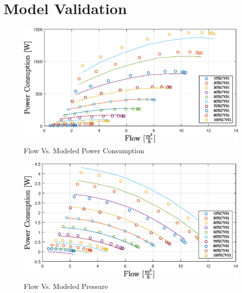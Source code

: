 \chapter{Model Validation}
\label{app:modelValidation}
\newpage
\begin{figure}[H]
	\centering
	\includegraphics[width=1\textheight, height = 1\textwidth, keepaspectratio, angle = 270]{figures/06ModelValidation/flowVsModeledPowerConsumption.eps}
	\caption{Flow Vs. Modeled Power Consumption}
\end{figure}

\begin{figure}[H]
	\centering
	\includegraphics[width=1\textheight, height = 1\textwidth, keepaspectratio, angle = 270]{figures/06ModelValidation/flowVsModeledPressure.eps}
	\caption{Flow Vs. Modeled Pressure}
\end{figure}

